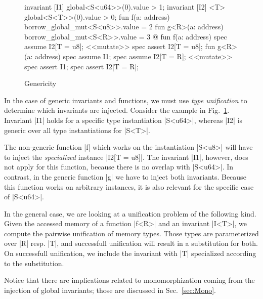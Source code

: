 
\begin{figure}[t!]
  \caption{Genericity}
  \label{fig:Genericity}
  \centering
\begin{MoveBox}
  invariant [I1] global<S<u64>>(0).value > 1;
  invariant [I2] <T> global<S<T>>(0).value > 0;
  fun f(a: address) { borrow_global_mut<S<u8>>.value = 2 }
  fun g<R>(a: address) { borrow_global_mut<S<R>>.value = 3 }
  @\transform@
  fun f(a: address) {
    spec assume I2[T = u8];
    <<mutate>>
    spec assert I2[T = u8];
  }
  fun g<R>(a: address) {
    spec assume I1;
    spec assume I2[T = R];
    <<mutate>>
    spec assert I1;
    spec assert I2[T = R];
  }
\end{MoveBox}
\end{figure}

In the case of generic invariants and functions, we must use \emph{type
  unification} to determine which invariants are injected. Consider the example
in Fig.~\ref{fig:Genericity}. Invariant |I1| holds for a specific type
instantiation |S<u64>|, whereas |I2| is generic over all type instantiations for
|S<T>|.

The non-generic function |f| which works on the instantiation |S<u8>| will have
to inject the \emph{specialized} instance |I2[T = u8]|. The invariant |I1|,
however, does not apply for this function, because there is no overlap with
|S<u64>|.  In contrast, in the generic function |g| we have to inject both
invariants. Because this function works on arbitrary instances, it is also
relevant for the specific case of |S<u64>|.

In the general case, we are looking at a unification problem of the following
kind. Given the accessed memory of a function |f<R>| and an invariant |I<T>|, we
compute the pairwise unification of memory types. Those types are parameterized
over |R| resp. |T|, and successfull unification will result in a substitution
for both. On successfull unification, we include the invariant with |T| specialized
according to the substitution.

Notice that there are implications related to monomorphization coming from the
injection of global invariants; those are discussed in Sec.~\ref{sec:Mono}.





